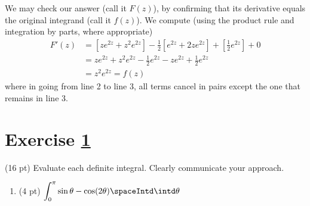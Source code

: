 {We may check our answer (call it $F(z)$), by confirming that its derivative equals the original integrand (call it $f(z)$). We compute (using the product rule and integration by parts, where appropriate)
\begin{align*}
F'(z)
&=
\left[z e^{2 z} + z^{2} e^{2 z}\right] - \frac{1}{2} \left[e^{2 z} + 2 z e^{2 z}\right] + \left[\frac{1}{2} e^{2 z}\right] + 0
\\
&=
z e^{2 z} + z^{2} e^{2 z} - \frac{1}{2} e^{2 z} - z e^{2 z} + \frac{1}{2} e^{2 z}
\\
&=
z^{2} e^{2 z}
=
f(z)
\end{align*}
where in going from line 2 to line 3, all terms cancel in pairs except the one that remains in line 3.}%





%
%
%
%


\newpage

\section{Exercise \ref{sec : Math112 Spring2022 MockExam3 Q3}}
\label{sec : Math112 Spring2022 MockExam3 Q3}

(16 pt) Evaluate each definite integral. Clearly communicate your approach.



\begin{enumerate}[label=(\alph*)]
\item\label{itm : ME3Q3a} (4 pt) $\displaystyle\int_{0}^{\pi} \sin \theta - \cos(2 \theta) \spaceIntd \intd \theta$
\end{enumerate}

